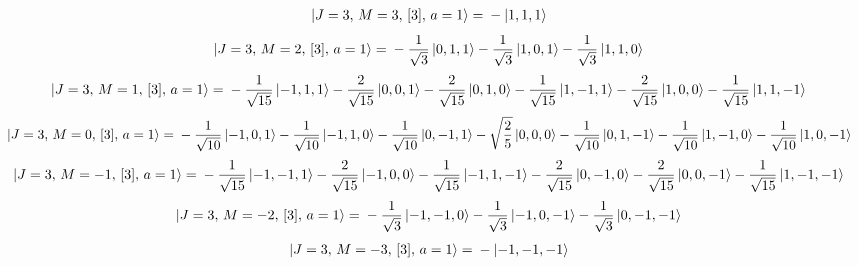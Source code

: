 \documentclass{article}
\begin{document}
\begin{equation*}
\begin{aligned}
\ket{J=3,\,M=3,\,[3],\,a=1} = \; &- \ket{1,1,1}
\end{aligned}
\end{equation*}
\begin{equation*}
\begin{aligned}
\ket{J=3,\,M=2,\,[3],\,a=1} = \; &- \frac{1}{\sqrt{3}} \ket{0,1,1} - \frac{1}{\sqrt{3}} \ket{1,0,1} - \frac{1}{\sqrt{3}} \ket{1,1,0}
\end{aligned}
\end{equation*}
\begin{equation*}
\begin{aligned}
\ket{J=3,\,M=1,\,[3],\,a=1} = \; &- \frac{1}{\sqrt{15}} \ket{-1,1,1} - \frac{2}{\sqrt{15}} \ket{0,0,1} - \frac{2}{\sqrt{15}} \ket{0,1,0} - \frac{1}{\sqrt{15}} \ket{1,-1,1} - \frac{2}{\sqrt{15}} \ket{1,0,0} - \frac{1}{\sqrt{15}} \ket{1,1,-1}
\end{aligned}
\end{equation*}
\begin{equation*}
\begin{aligned}
\ket{J=3,\,M=0,\,[3],\,a=1} = \; &- \frac{1}{\sqrt{10}} \ket{-1,0,1} - \frac{1}{\sqrt{10}} \ket{-1,1,0} - \frac{1}{\sqrt{10}} \ket{0,-1,1} - \sqrt{\frac{2}{5}} \ket{0,0,0} - \frac{1}{\sqrt{10}} \ket{0,1,-1} - \frac{1}{\sqrt{10}} \ket{1,-1,0} - \frac{1}{\sqrt{10}} \ket{1,0,-1}
\end{aligned}
\end{equation*}
\begin{equation*}
\begin{aligned}
\ket{J=3,\,M=-1,\,[3],\,a=1} = \; &- \frac{1}{\sqrt{15}} \ket{-1,-1,1} - \frac{2}{\sqrt{15}} \ket{-1,0,0} - \frac{1}{\sqrt{15}} \ket{-1,1,-1} - \frac{2}{\sqrt{15}} \ket{0,-1,0} - \frac{2}{\sqrt{15}} \ket{0,0,-1} - \frac{1}{\sqrt{15}} \ket{1,-1,-1}
\end{aligned}
\end{equation*}
\begin{equation*}
\begin{aligned}
\ket{J=3,\,M=-2,\,[3],\,a=1} = \; &- \frac{1}{\sqrt{3}} \ket{-1,-1,0} - \frac{1}{\sqrt{3}} \ket{-1,0,-1} - \frac{1}{\sqrt{3}} \ket{0,-1,-1}
\end{aligned}
\end{equation*}
\begin{equation*}
\begin{aligned}
\ket{J=3,\,M=-3,\,[3],\,a=1} = \; &- \ket{-1,-1,-1}
\end{aligned}
\end{equation*}
\end{document}
